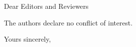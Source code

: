 \documentclass{letter}
\begin{document}
	\begin{letter}{}
		
		\opening{Dear Editors and Reviewers}
		
		The authors declare no conflict of interest.
		
		\closing{Yours sincerely,}
	\end{letter}
	
\end{document}
